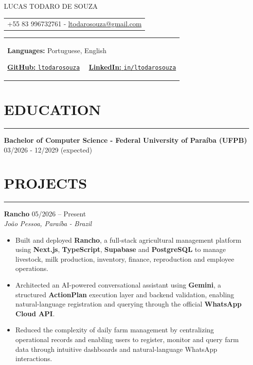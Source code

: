 \documentclass[10pt,a4paper]{article}
\begin{document}
\pagestyle{empty}

\begin{center}

{\Huge LUCAS TODARO DE SOUZA} 
\begin{center}
\begin{tabular}{l}
{+55 83 996732761 -} 
\href{mailto:ltodarosouza@gmail.com}{ltodarosouza@gmail.com}
  \\
 \end{tabular}
\end{center}
\end{center}
\begin{tabular}{l}

\textbf{Languages:} Portuguese, English  \

\href{https://github.com/ltodarosouza}{\textbf{GitHub:} \texttt{ltodarosouza}} 
\ \  
\href{https://www.linkedin.com/in/ltodarosouza/}{\textbf{LinkedIn:} \texttt{in/ltodarosouza}} 

\end{tabular}
\section*{EDUCATION}
\vspace{-2.5mm}
\hrule
\vspace{1.2mm}


\textbf{Bachelor of Computer Science - Federal University of Paraíba (UFPB) } \hfill 03/2026 - 12/2029 (expected)

\section*{PROJECTS}
\vspace{-2.5mm}
\hrule  
\vspace{1.2mm}

\textbf{Rancho} \hfill 05/2026 -- Present \\
\textit{João Pessoa, Paraíba - Brazil}
\begin{itemize}[leftmargin=*,itemsep=-2pt,topsep=1pt]
    \item Built and deployed \textbf{Rancho}, a full-stack agricultural management platform using \textbf{Next.js}, \textbf{TypeScript}, \textbf{Supabase} and \textbf{PostgreSQL} to manage livestock, milk production, inventory, finance, reproduction and employee operations.
    \item Architected an AI-powered conversational assistant using \textbf{Gemini}, a structured \textbf{ActionPlan} execution layer and backend validation, enabling natural-language registration and querying through the official \textbf{WhatsApp Cloud API}.
    \item Reduced the complexity of daily farm management by centralizing operational records and enabling users to register, monitor and query farm data through intuitive dashboards and natural-language WhatsApp interactions.
\end{itemize}
\end{document}
